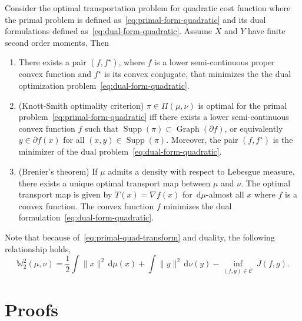 \documentclass[10pt]{article}
\newcommand{\ud}{\,\mathrm{d}}
\newcommand{\op}[1]{\operatorname{#1}}
\newcommand{\norm}[1]{\|#1\|}
\newcommand{\W}{\mathds{W}}
\newcommand{\calC}{\mathcal{C}}
\numberwithin{equation}{section}
\begin{document}
\begin{theorem}\label{thm:Brenier}
	Consider the optimal transportation problem for quadratic cost function where the primal problem is defined as~\eqref{eq:primal-form-quadratic} and its dual formulations defined as~\eqref{eq:dual-form-quadratic}. Assume $X$ and $Y$ have finite second order moments. Then 
	\begin{enumerate}
		\item There exists a pair $(f,f^\star)$, where $f$ is a lower semi-continuous proper convex function and $f^\star$ is its convex conjugate, that minimizes the the dual optimization problem~\eqref{eq:dual-form-quadratic}.
		
		\item (Knott-Smith optimality criterion) $\pi \in \Pi(\mu,\nu)$ is optimal for the primal problem~\eqref{eq:primal-form-quadratic} iff there exists a lower semi-continuous convex function $f$ such that $\op{Supp}(\pi) \subset \op{Graph}(\partial f)$, or equivalently $y \in \partial f(x)$ for all $(x,y) \in \op{Supp}(\pi)$. Moreover, the pair $(f,f^\star)$ is the minimizer of the dual problem~\eqref{eq:dual-form-quadratic}.
		\item (Brenier's theorem) If $\mu$ admits a density with respect to Lebesgue measure, there exists a unique optimal transport map between $\mu$ and $\nu$. The optimal transport map is given by $T(x) = \nabla f(x)$ for $\ud \mu$-almost all $x$ where $f$ is a convex function. The convex function $f$ minimizes the dual formulation~\eqref{eq:dual-form-quadratic}. 
	\end{enumerate}
\end{theorem}

\begin{remark}
	Note that because of~\eqref{eq:primal-quad-transform} and duality, the following relationship holds,
	\begin{equation*}%
	\W_2^2(\mu,\nu) = 
	\frac{1}{2} \int \norm{x}^2 \ud \mu(x) + \int \norm{y}^2\ud \nu(y)
	- \inf_{(f,g) \in \overline{\calC} }~ \bar{J}(f,g). 
	\end{equation*}
\end{remark}



\section{Proofs}
\end{document}
